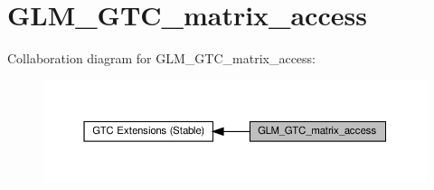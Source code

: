 \hypertarget{group__gtc__matrix__access}{}\section{G\+L\+M\+\_\+\+G\+T\+C\+\_\+matrix\+\_\+access}
\label{group__gtc__matrix__access}
Collaboration diagram for G\+L\+M\+\_\+\+G\+T\+C\+\_\+matrix\+\_\+access\+:\nopagebreak
\begin{figure}[H]
\begin{center}
\leavevmode
\includegraphics[width=350pt]{group__gtc__matrix__access}
\end{center}
\end{figure}
